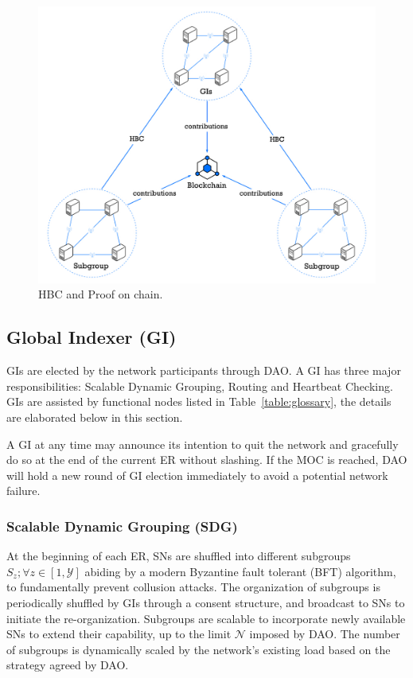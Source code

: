 \begin{figure}[tb!]
    \centering
    \includegraphics[width=\columnwidth]{figures/hbc.jpg}
    \caption{HBC and Proof on chain.}
    \label{fig:hbc-proof}
\end{figure}

\subsection{Global Indexer (GI)}

GIs are elected by the network participants through DAO. A GI has three major responsibilities: Scalable Dynamic Grouping, Routing and Heartbeat Checking. GIs are assisted by functional nodes listed in Table~\ref{table:glossary}, the details are elaborated below in this section.

A GI at any time may announce its intention to quit the network and gracefully do so at the end of the current ER without slashing. If the MOC is reached, DAO will hold a new round of GI election immediately to avoid a potential network failure.

\subsubsection{Scalable Dynamic Grouping (SDG)}

At the beginning of each ER, SNs are shuffled into different subgroups $S_z;\forall z \in [1,\mathcal{Y}]$ abiding by a modern Byzantine fault tolerant (BFT) algorithm\cite{castro2002Practical,lamport1982Byzantine,badger-bft, tendermint}, to fundamentally prevent collusion attacks. The organization of subgroups is periodically shuffled by GIs through a consent structure, and broadcast to SNs to initiate the re-organization. Subgroups are scalable to incorporate newly available SNs to extend their capability, up to the limit $\mathcal{N}$ imposed by DAO. The number of subgroups is dynamically scaled by the network's existing load based on the strategy agreed by DAO.


